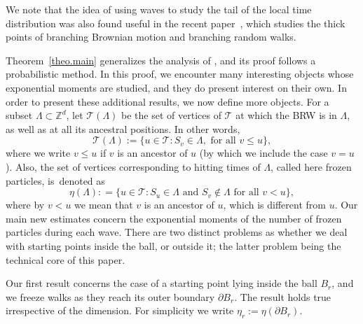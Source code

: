 \documentclass[JEP,XML,SOM,Unicode,NoFloatCountersInSection,published]{cedram}
\theoremstyle{plain}
\theoremstyle{definition}
\newcommand\Z{\mathbb{Z}}
\newcommand{\1}{{\text{\Large $\mathfrak 1$}}}
\begin{document}
We note that the idea of using waves to study the tail of the local time distribution was also found useful in the recent paper~\cite{BHJ23}, which studies the thick points of branching Brownian motion and branching random walks.

Theorem~\ref{theo.main} generalizes the analysis of \cite{AHJ},
and its proof follows a probabilistic method. In this proof, we
encounter many interesting objects whose exponential moments
are studied, and they do present interest on their own.
In order to present these additional results, we now define more objects.
For a subset $\Lambda\subset \Z^d$, let $\mathcal T(\Lambda)$
be the set of vertices of $\mathcal T$ at which the BRW is in $\Lambda$, as well as at all its ancestral positions. In other words,
\begin{equation}\label{def.Tr}
\mathbf {\mathcal T}(\Lambda) :=
\big\{u\in \mathbf{\mathcal T}: S_v\in \Lambda, \text{ for all }v\le u\},
\end{equation}
where we write $v\le u$ if $v$ is an ancestor of $u$ (by which we include the case $v=u$).
Also, the set of vertices corresponding to hitting times of $\Lambda$, called here frozen particles, is~denoted as
\begin{equation}\label{etar}
\eta(\Lambda) : = \big\{u\in \mathbf {\mathcal T}: S_u \in \Lambda
\text{ and }S_v \notin \Lambda \text{ for all }v< u\},
\end{equation}
where by $v<u$ we mean that $v$ is an ancestor of $u$, which is different from $u$.
Our main new estimates concern the exponential moments of the
number of frozen particles during each wave. There are two distinct
problems as whether we deal with starting points inside the ball, or outside it;
the latter problem being the technical core of this paper.

Our first result concerns the case of a starting point
lying inside the ball $B_r$, and
we freeze walks as they reach its outer boundary $\partial B_r$. The result holds true irrespective of the dimension.
For simplicity we write $\eta_r:=\eta(\partial B_r)$.
\end{document}
